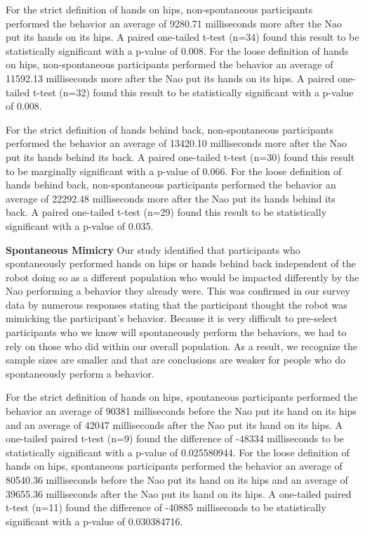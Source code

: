 \documentclass{acm_proc_article-sp}
\begin{document}
For the strict definition of hands on hips, non-spontaneous participants performed the behavior an average of 9280.71 milliseconds more after the Nao put its hands on its hips. A paired one-tailed t-test (n=34) found this result to be statistically significant with a p-value of 0.008. For the loose definition of hands on hips, non-spontaneous participants performed the behavior an average of 11592.13 milliseconds more after the Nao put its hands on its hips. A paired one-tailed t-test (n=32) found this result to be statistically significant with a p-value of 0.008. 

For the strict definition of hands behind back, non-spontaneous participants performed the behavior an average of 13420.10 milliseconds more after the Nao put its hands behind its back. A paired one-tailed t-test (n=30) found this result to be marginally significant with a p-value of 0.066. For the loose definition of hands behind back, non-spontaneous participants performed the behavior an average of 22292.48 milliseconds more after the Nao put its hands behind its back. A paired one-tailed t-test (n=29) found this result to be statistically significant with a p-value of 0.035.

\textbf{Spontaneous Mimicry} Our study identified that participants who spontaneously performed hands on hips or hands behind back independent of the robot doing so as a different population who would be impacted differently by the Nao performing a behavior they already were. This was confirmed in our survey data by numerous responses stating that the participant thought the robot was mimicking the participant's behavior. Because it is very difficult to pre-select participants who we know will spontaneously perform the behaviors, we had to rely on those who did within our overall population. As a result, we recognize the sample sizes are smaller and that are conclusions are weaker for people who do spontaneously perform a behavior.

For the strict definition of hands on hips, spontaneous participants performed the behavior an average of 90381 milliseconds before the Nao put its hand on its hips and an average of 42047 milliseconds after the Nao put its hand on its hips. A one-tailed paired t-test (n=9) found the difference of -48334 milliseconds to be statistically significant with a p-value of 0.025580944. For the loose definition of hands on hips, spontaneous participants performed the behavior an average of 80540.36 milliseconds before the Nao put its hand on its hips and an average of 39655.36 milliseconds after the Nao put its hand on its hips. A one-tailed paired t-test (n=11) found the difference of -40885 milliseconds to be statistically significant with a p-value of 0.030384716.
\end{document}
